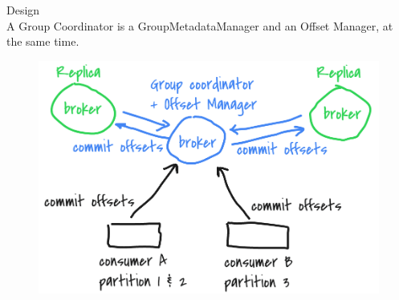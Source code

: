 \begin{frame}[plain,t]{Design} %
     \\
    \vspace{2ex}
   A Group Coordinator is a GroupMetadataManager and an Offset Manager,  at the same time.
   
   \begin{figure}
       \centering
       \includegraphics[width=0.7\linewidth]{image/0306}
       \label{fig:0306}
   \end{figure}
    
\end{frame}


